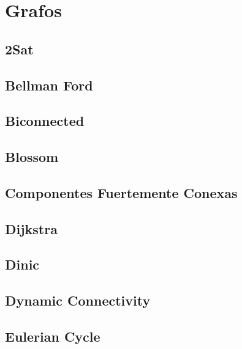 \documentclass[9pt,portrait,twocolumn,a4paper,notitlepage]{article}
\newcommand\cppfile[2][]{%
\ifstrempty{#1}{}{}%
}
\begin{document}

\section{Grafos}

\subsection{2Sat}
\cppfile{grafos_clean/2SAT.cpp}

\subsection{Bellman Ford}
\cppfile{grafos_clean/bellman_ford.cpp}

\subsection{Biconnected}
\cppfile{grafos_clean/biconnected.cpp}

\subsection{Blossom}
\cppfile{grafos_clean/blossom.cpp}

\subsection{Componentes Fuertemente Conexas}
\cppfile{grafos_clean/componentes_fuertemente_conexas.cpp}

\subsection{Dijkstra}
\cppfile{grafos_clean/dijkstra.cpp}

\subsection{Dinic}
\cppfile{grafos_clean/dinic.cpp}

\subsection{Dynamic Connectivity}
\cppfile{grafos_clean/dynamic_connectivity.cpp}

\subsection{Eulerian Cycle}
\cppfile{grafos_clean/eulerian_cycle.cpp}
\end{document}
